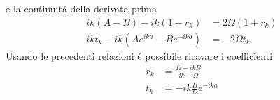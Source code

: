 \documentclass[a4paper]{article}
\begin{document}
        e la continuit\'a della derivata prima
        \begin{equation*}
            \begin{split}
                ik(A-B)-ik(1-r_k)&=2\Omega(1+r_k)\\
                ikt_k-ik(Ae^{ika}-Be^{-ika})&=-2\Omega t_k
            \end{split}
        \end{equation*}
        Usando le precedenti relazioni \'e possibile ricavare i coefficienti
        \begin{equation*}
            \begin{split}
                r_k&=\frac{\Omega-ikB}{ik-\Omega}\\
                t_k&=-ik\frac{B}{\Omega}e^{-ika}
            \end{split}
        \end{equation*}
        \begin{center}
        \end{center}
\end{document}
